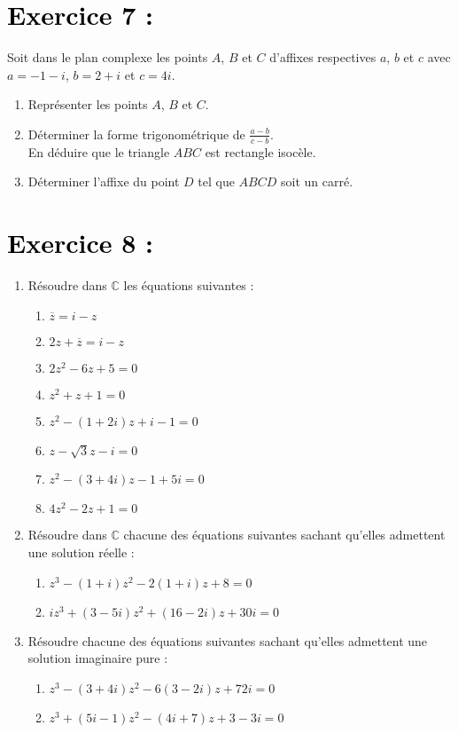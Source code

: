 \documentclass[12pt]{article}
\begin{document}
\section*{\textcolor{black}{Exercice 7 :}}

Soit dans le plan complexe les points $A$, $B$ et $C$ d’affixes respectives $a$, $b$ et $c$ avec $a = -1 - i$, $b = 2 + i$ et $c = 4i$.

\begin{enumerate}
    \item Représenter les points $A$, $B$ et $C$.
    \item Déterminer la forme trigonométrique de $\frac{a - b}{c - b}$.\\  
    En déduire que le triangle $ABC$ est rectangle isocèle.
    \item Déterminer l’affixe du point $D$ tel que $ABCD$ soit un carré.
\end{enumerate}

\section*{\textcolor{black}{Exercice 8 :}}

\begin{enumerate}
    \item Résoudre dans $\mathbb{C}$ les équations suivantes :
    \begin{enumerate}
        \item $\overline{z} = i - z$
        \item $2z + \overline{z} = i - z$
        \item $2z^2 - 6z + 5 = 0$
        \item $z^2 + z + 1 = 0$
        \item $z^2 - (1 + 2i)z + i - 1 = 0$
        \item $z - \sqrt{3}z - i = 0$
        \item $z^2 - (3 + 4i)z - 1 + 5i = 0$
        \item $4z^2 - 2z + 1 = 0$
    \end{enumerate}

    \item Résoudre dans $\mathbb{C}$ chacune des équations suivantes sachant qu’elles admettent une solution réelle :
    \begin{enumerate}
        \item $z^3 - (1 + i)z^2 - 2(1 + i)z + 8 = 0$
        \item $iz^3 + (3 - 5i)z^2 + (16 - 2i)z + 30i = 0$
    \end{enumerate}

    \item Résoudre chacune des équations suivantes sachant qu’elles admettent une solution imaginaire pure :
    \begin{enumerate}
        \item $z^3 - (3 + 4i)z^2 - 6(3 - 2i)z + 72i = 0$
        \item $z^3 + (5i - 1)z^2 - (4i + 7)z + 3 - 3i = 0$
    \end{enumerate}
\end{enumerate}
\end{document}

